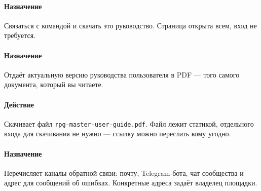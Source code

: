 
\paragraph{Назначение}
Связаться с командой и скачать это руководство. Страница открыта всем, вход не требуется.



\paragraph{Назначение}
Отдаёт актуальную версию руководства пользователя в PDF --- того самого документа, который вы читаете.

\paragraph{Действие}
Скачивает файл \texttt{rpg-master-user-guide.pdf}. Файл лежит статикой, отдельного входа для скачивания не нужно --- ссылку можно переслать кому угодно.


\paragraph{Назначение}
Перечисляет каналы обратной связи: почту, Telegram-бота, чат сообщества и адрес для сообщений об ошибках. Конкретные адреса задаёт владелец площадки.
